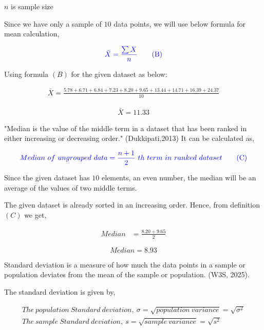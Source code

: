 \documentclass[a4paper]{report}
\begin{document}
$n$ is sample size

Since we have only a sample of $10$ data points, we will use below formula for mean calculation,

\begin{equation*}
    \color{blue} \bar{X} = \frac{\sum X}{n} \tag{B}
\end{equation*}



Using formula $(B)$ for the given dataset as below:

\begin{align*}
    \bar{X} = \frac{5.78+ 6.71+6.84+7.23+8.20+9.65+13.44+ 14.71+ 16.39+24.37}{10}
\end{align*}

\begin{align}
    \boxed{\bar{X} = 11.33}
\end{align}

"Median is the value of the middle term in a dataset that has been ranked in either increasing or decreasing order." (Dukkipati,2013)
It can be calculated as,

\begin{equation*}
    \color{blue} Median\ of\ ungrouped\ data=\frac{n+1}{2}\ th\ term\ in\ ranked\ dataset \tag{C}
\end{equation*}

Since the given dataset has $10$ elements, an even number, the  median will be an average of the values of two middle terms.

The given dataset is already sorted in an increasing order. Hence, from definition $(C)$ we get,

\begin{align*}
    Median&=\frac{8.20 + 9.65}{2} 
\end{align*}

\begin{equation}
    \boxed{Median=8.93}
\end{equation}

Standard deviation is a measure of how much the data points in a sample or population deviates from the mean of the sample or population. (W3S, 2025).

\newpage
The standard deviation is given by,

\begin{align*}
    The\ population\ Standard\ deviation,\ \sigma=\sqrt{population\ variance} = \sqrt{\sigma^2} \\
    The\ sample\ Standard\ deviation,\ s=\sqrt{sample\ variance} = \sqrt{s^2} 
\end{align*}
\end{document}
